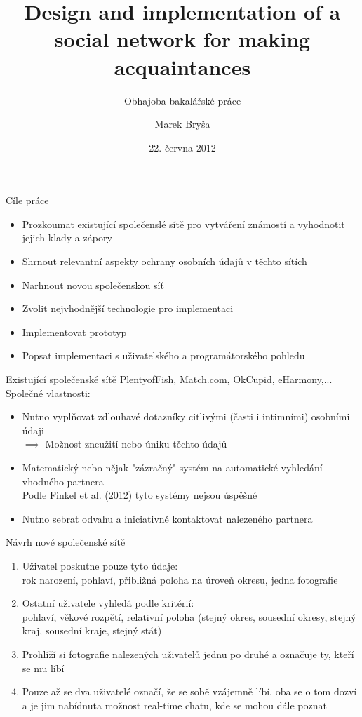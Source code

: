 \documentclass[xcolor=dvipsnames]{beamer}
\title{Design and implementation of a social network for making acquaintances}
\subtitle{Obhajoba bakalářské práce}
\author{Marek Bryša}
\date{22. června 2012}
\institute
{
Masarykova Univerzita\\
Fakulta informatiky
}
\begin{document}
  \frame{\titlepage}
	\begin{frame}{Cíle práce}
		\begin{itemize}
			\item Prozkoumat existující společenslé sítě pro vytváření známostí a vyhodnotit jejich klady a zápory
			\item Shrnout relevantní aspekty ochrany osobních údajů v těchto sítích
			\item Narhnout novou společenskou síť
			\item Zvolit nejvhodnější technologie pro implementaci
			\item Implementovat prototyp
			\item Popsat implementaci s uživatelského a programátorského pohledu
		\end{itemize}
	\end{frame}
	\begin{frame}{Existující společenské sítě}
		PlentyofFish, Match.com, OkCupid, eHarmony,...\\
		\bigskip
		Společné vlastnosti:
		\begin{itemize}
			\item Nutno vyplňovat zdlouhavé dotazníky citlivými (časti i intimními) osobními údaji\\
				$\implies$ Možnost zneužití nebo úniku těchto údajů
			\item Matematický nebo nějak "zázračný" systém na automatické vyhledání vhodného partnera\\
				Podle Finkel et al. (2012) tyto systémy nejsou úspěšné
			\item Nutno sebrat odvahu a iniciativně kontaktovat nalezeného partnera\\
				
		\end{itemize}
	\end{frame}
	\begin{frame}{Návrh nové společenské sítě}
		\begin{enumerate}
			\item Uživatel poskutne pouze tyto údaje:\\
		    rok narození, pohlaví, přibližná poloha na úroveň okresu, jedna fotografie
	    \item Ostatní uživatele vyhledá podle kritérií:\\
	      pohlaví, věkové rozpětí, relativní poloha (stejný okres, sousední okresy, stejný kraj, sousední kraje, stejný stát)
	    \item Prohlíží si fotografie nalezených uživatelů jednu po druhé a označuje ty, kteří se mu líbí
	    \item Pouze až se dva uživatelé označí, že se sobě vzájemně líbí, oba se o tom dozví a je jim nabídnuta možnost real-time chatu, kde se mohou dále poznat
		\end{enumerate}
	\end{frame}
\end{document}
